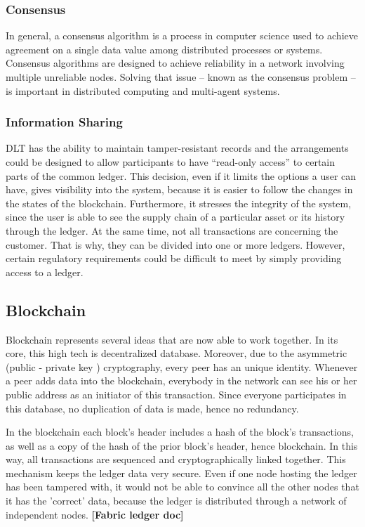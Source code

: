 \documentclass[a4paper,11pt]{report}
\begin{document}
\subsubsection{Consensus}  
\label{consensus}

In general, a consensus algorithm is a process in computer science used to achieve agreement on a single data value among distributed processes or systems. Consensus algorithms are designed to achieve reliability in a network involving multiple unreliable nodes. Solving that issue – known as the consensus problem – is important in distributed computing and multi-agent systems.\cite{mills2016distributed}

\subsubsection{Information Sharing}  
\label{infosharing}
DLT has the ability to maintain tamper-resistant records and the arrangements could be designed to allow participants to have “read-only access” to certain parts of the common ledger. This decision, even if it limits the options a user can have, gives visibility into the system, because it is easier to follow the changes in the states of the blockchain. Furthermore, it stresses the integrity of the system, since the user is able to see the supply chain of a particular asset or its history through the ledger.
At the same time, not all transactions are concerning the customer. That is why, they can be divided into one or more ledgers. However, certain regulatory requirements could be difficult to meet by simply providing access to a ledger.\cite{mills2016distributed}

\subsection{Blockchain}
\label{blockchain}

Blockchain represents several ideas that are now able to work together. In its core, this high tech is decentralized database. Moreover, due to the asymmetric (public - private key ) cryptography, every peer has an unique identity. Whenever a peer adds data into the blockchain, everybody in the network can see his or her public address as an initiator of this transaction. Since everyone participates in this database, no duplication of data is made, hence no redundancy. 

In the blockchain each block's header includes a hash of the block’s transactions, as well as a copy of the hash of the prior block's header, hence blockchain. In this way, all transactions are sequenced and cryptographically linked together. This mechanism keeps the ledger data very secure. Even if one node hosting the ledger has been tampered with, it would not be able to convince all the other nodes that it has the 'correct' data, because the ledger is distributed through a network of independent nodes. \textbf{[Fabric ledger doc] }
 
\end{document}
